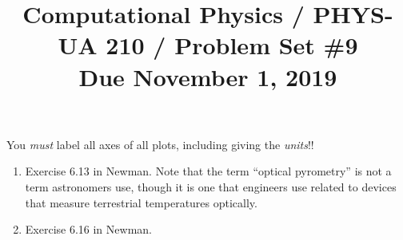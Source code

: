 \documentclass[11pt, preprint]{aastex}
\begin{document}
\title{\bf Computational Physics / PHYS-UA 210 / Problem Set \#9
\\ Due November 1, 2019 }

You {\it must} label all axes of all plots, including giving the {\it
  units}!!

\begin{enumerate} 
\item Exercise 6.13 in Newman. Note that the term ``optical
  pyrometry'' is not a term astronomers use, though it is one that
  engineers use related to devices that measure terrestrial
  temperatures optically.
\item Exercise 6.16 in Newman.
\end{enumerate} 
\end{document}

